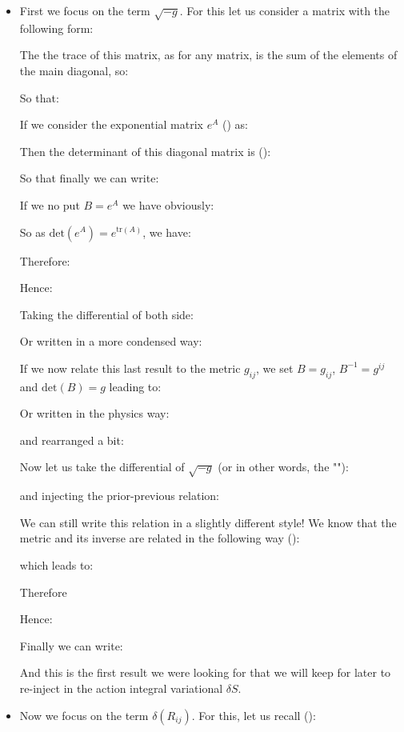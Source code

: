 	\begin{itemize}
		\item First we focus on the term $\sqrt{-g}$. For this let us consider a matrix with the following form:
		
		The the trace of this matrix, as for any matrix, is the sum of the elements of the main diagonal, so:
		
		So that:
		
		If we consider the exponential matrix $e^A$ () as:
		
		Then the determinant of this diagonal matrix is ():
		
		So that finally we can write:
		
		If we no put $B=e^A$ we have obviously:
		
		So as $\text{det}(e^A)=e^{\text{tr}(A)}$, we have:
		
		Therefore:
		
		Hence:
		
		Taking the differential of both side:
		
		Or written in a more condensed way:
		
		If we now relate this last result to the metric $g_{ij}$, we set $B=g_{ij}$, $B^{-1}=g^{ij}$ and $\text{det}(B)=g$ leading to:
		
		Or written in the physics way:
		
		and rearranged a bit:
		
		Now let us take the differential of $\sqrt{-g}$ (or in other words, the ""):
		
		and injecting the prior-previous relation:
		
		We can still write this relation in a slightly different style! We know that the metric and its inverse are related in the following way ():
		
		which leads to:
		
		Therefore
		
		Hence:
		
		Finally we can write:
		
		And this is the first result we were looking for that we will keep for later to re-inject in the action integral variational $\delta S$.
		
		\item Now we focus on the term $\delta(R_{ij})$. For this, let us recall ():
	

\end{itemize}
